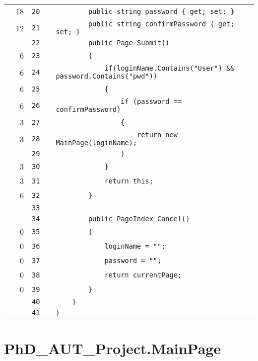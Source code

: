 \documentclass[a4paper,landscape,10pt]{article}
\begin{document}
\begin{longtable}[l]{lrrll}
\cellcolor{green} & 18 & \verb~20~ & & \verb~        public string password { get; set; }~\\
\cellcolor{green} & 12 & \verb~21~ & & \verb~        public string confirmPassword { get; set; }~\\
\cellcolor{gray} &  & \verb~22~ & & \verb~        public Page Submit()~\\
\cellcolor{green} & 6 & \verb~23~ & & \verb~        {~\\
\cellcolor{orange} & 6 & \verb~24~ & & \verb~            if(loginName.Contains("User") && password.Contains("pwd"))~\\
\cellcolor{green} & 6 & \verb~25~ & & \verb~            {~\\
\cellcolor{green} & 6 & \verb~26~ & & \verb~                if (password == confirmPassword)~\\
\cellcolor{green} & 3 & \verb~27~ & & \verb~                {~\\
\cellcolor{green} & 3 & \verb~28~ & & \verb~                    return new MainPage(loginName);~\\
\cellcolor{gray} &  & \verb~29~ & & \verb~                }~\\
\cellcolor{green} & 3 & \verb~30~ & & \verb~            }~\\
\cellcolor{green} & 3 & \verb~31~ & & \verb~            return this;~\\
\cellcolor{green} & 6 & \verb~32~ & & \verb~        }~\\
\cellcolor{gray} &  & \verb~33~ & & \verb~~\\
\cellcolor{gray} &  & \verb~34~ & & \verb~        public PageIndex Cancel()~\\
\cellcolor{red} & 0 & \verb~35~ & & \verb~        {~\\
\cellcolor{red} & 0 & \verb~36~ & & \verb~            loginName = "";~\\
\cellcolor{red} & 0 & \verb~37~ & & \verb~            password = "";~\\
\cellcolor{red} & 0 & \verb~38~ & & \verb~            return currentPage;~\\
\cellcolor{red} & 0 & \verb~39~ & & \verb~        }~\\
\cellcolor{gray} &  & \verb~40~ & & \verb~    }~\\
\cellcolor{gray} &  & \verb~41~ & & \verb~}~\\
\end{longtable}
\newpage
\section{PhD\_AUT\_Project.MainPage}
\end{document}

